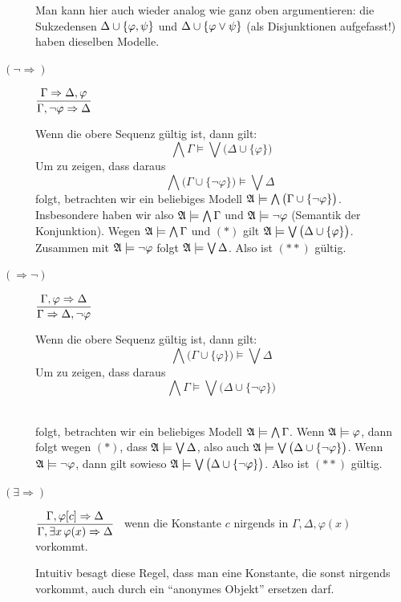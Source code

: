 \documentclass[fontsize=11pt, twoside=false, numbers=autoenddot]{scrbook}
\begin{document}
\begin{description}
    Man kann hier auch wieder analog wie ganz oben argumentieren:
    die Sukzedensen $\Delta \cup\{\varphi,\psi\}$ und $\Delta \cup \{\varphi \vee \psi\}$
    (als Disjunktionen aufgefasst!)
    haben dieselben Modelle.
    \par\bigskip
  \item[{\boldmath $(\lnot \Rightarrow)$}]
    $
      \displaystyle
      \frac{\Gamma \Rightarrow \Delta,\varphi}{\Gamma,\neg \varphi \Rightarrow \Delta}
    $
    ~\par\medskip
    Wenn die obere Sequenz gültig ist, dann gilt:
    \[
      \tag{$*$}
      \bigwedge \Gamma \models
      \bigvee \big(\Delta \cup \{\varphi\}\big)
    \]
    Um zu zeigen, dass daraus
    \[
      \tag{$**$}
      \bigwedge \big(\Gamma \cup \{\lnot\varphi\}\big) \models
      \bigvee \Delta\
    \]
    folgt, betrachten wir ein beliebiges Modell $\mathfrak{A} \models \bigwedge \big(\Gamma \cup \{\lnot\varphi\}\big)$.
    Insbesondere haben wir also $\mathfrak{A} \models \bigwedge \Gamma$ und $\mathfrak{A} \models \lnot\varphi$ (Semantik der Konjunktion).
    Wegen $\mathfrak{A} \models \bigwedge \Gamma$ und $(*)$ gilt $\mathfrak{A} \models \bigvee \big(\Delta \cup \{\varphi\}\big)$.
    Zusammen mit $\mathfrak{A} \models \lnot\varphi$ folgt $\mathfrak{A} \models \bigvee \Delta$.
    Also ist $(**)$ gültig.
    \par\bigskip
  \item[{\boldmath $(\Rightarrow \lnot)$}]
    $
      \displaystyle
      \frac{\Gamma,\varphi \Rightarrow \Delta}{\Gamma \Rightarrow \Delta,\neg \varphi}
    $
    ~\par\medskip
    Wenn die obere Sequenz gültig ist, dann gilt:
    \[
      \tag{$*$}
      \bigwedge \big(\Gamma\cup \{\varphi\}\big) \models
      \bigvee \Delta
    \]
    Um zu zeigen, dass daraus
    \[
      \tag{$**$}
      \bigwedge \Gamma \models
      \bigvee \big(\Delta \cup \{\lnot\varphi\}\big)
    \]
    ~\par\medskip
    folgt, betrachten wir ein beliebiges Modell $\mathfrak{A} \models \bigwedge \Gamma$.
    Wenn $\mathfrak{A} \models \varphi$, dann folgt wegen $(*)$, dass $\mathfrak{A} \models \bigvee \Delta$,
    also auch $\mathfrak{A} \models \bigvee \big(\Delta \cup \{\lnot \varphi\}\big)$.
    Wenn $\mathfrak{A} \models \lnot \varphi$, dann gilt sowieso $\mathfrak{A} \models \bigvee \big(\Delta \cup \{\lnot \varphi\}\big)$.
    Also ist $(**)$ gültig.
    \par\bigskip
  \item[{\boldmath $(\exists \Rightarrow)$}]
    $
      \displaystyle
      \frac{\Gamma,\varphi[c] \Rightarrow \Delta}{\Gamma, \exists x \, \varphi(x) \Rightarrow \Delta}
    $
    ~wenn die Konstante $c$ nirgends in $\Gamma,\Delta,\varphi(x)$ vorkommt.
    ~\par\medskip
    Intuitiv besagt diese Regel, dass man eine Konstante, die sonst nirgends vorkommt,
    auch durch ein "`anonymes Objekt"' ersetzen darf.


\end{description}
\end{document}
